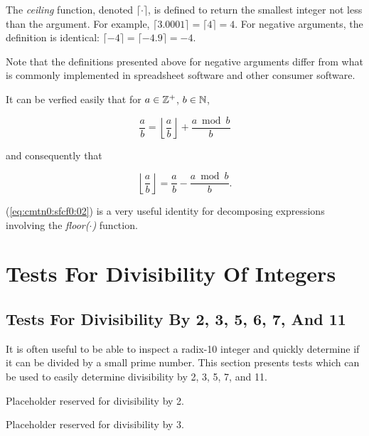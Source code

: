 The \emph{ceiling} function, denoted $\lceil\cdot\rceil$, is defined to return
the smallest integer not less than the argument.  For example, 
$\lceil 3.0001 \rceil = \lceil 4 \rceil = 4$.  For negative arguments, the definition
is identical:  $\lceil -4 \rceil = \lceil -4.9 \rceil = -4$.

Note that the definitions presented above for negative arguments
differ from what is commonly implemented in spreadsheet software and other consumer
software.

It can be verfied easily that for 
$a \in {\mathbb{Z}^+}$, $b \in {\mathbb{N}}$,

\begin{equation}
\label{eq:cmtn0:sfcf0:01}
\frac{a}{b} = \left\lfloor\frac{a}{b}\right\rfloor + \frac{a \bmod b}{b}
\end{equation}

\noindent{}and consequently that

\begin{equation}
\label{eq:cmtn0:sfcf0:02}
\left\lfloor\frac{a}{b}\right\rfloor = \frac{a}{b} - \frac{a \bmod b}{b} .
\end{equation}

\noindent{}(\ref{eq:cmtn0:sfcf0:02}) is a very useful identity for 
decomposing expressions involving the \emph{floor($\cdot$)} function.

\section{Tests For Divisibility Of Integers}

\subsection{Tests For Divisibility By 2, 3, 5, 6, 7, And 11}

It is often useful to be able to inspect a radix-10 integer and quickly
determine if it can be divided by a small prime number.  This section
presents tests which can be used to easily determine divisibility by
2, 3, 5, 7, and 11.

Placeholder
reserved for divisibility by 2.

Placeholder
reserved for divisibility by 3.

